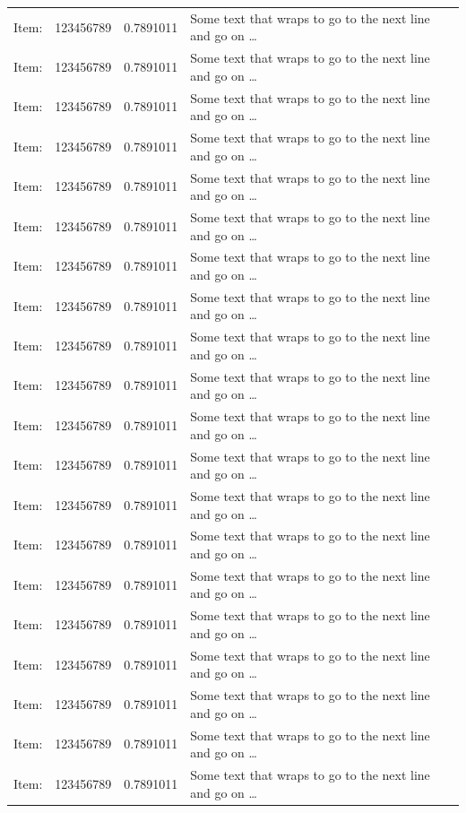 \documentclass[ms-thesis,mathdesign,chpterrefs,showgrid]{ndsu-thesis-tagged}%
\begin{document}
\begin{xltabular}{\textwidth}{ Y ZZ A }
    Item: & 123456789 & 0.7891011 & Some text that wraps to go to the next line and go on \ldots  \\
    Item: & 123456789 & 0.7891011 & Some text that wraps to go to the next line and go on \ldots  \\
    Item: & 123456789 & 0.7891011 & Some text that wraps to go to the next line and go on \ldots  \\
    \cmidrule(lr){2-3}
    Item: & 123456789 & 0.7891011 & Some text that wraps to go to the next line and go on \ldots  \\
    Item: & 123456789 & 0.7891011 & Some text that wraps to go to the next line and go on \ldots  \\
    Item: & 123456789 & 0.7891011 & Some text that wraps to go to the next line and go on \ldots  \\
    \cmidrule(lr){2-4}
    Item: & 123456789 & 0.7891011 & Some text that wraps to go to the next line and go on \ldots  \\
    Item: & 123456789 & 0.7891011 & Some text that wraps to go to the next line and go on \ldots  \\
    \cmidrule(lr){1-3}
    Item: & 123456789 & 0.7891011 & Some text that wraps to go to the next line and go on \ldots  \\
    Item: & 123456789 & 0.7891011 & Some text that wraps to go to the next line and go on \ldots  \\
    Item: & 123456789 & 0.7891011 & Some text that wraps to go to the next line and go on \ldots  \\
\midrule
    Item: & 123456789 & 0.7891011 & Some text that wraps to go to the next line and go on \ldots  \\
    Item: & 123456789 & 0.7891011 & Some text that wraps to go to the next line and go on \ldots  \\
    Item: & 123456789 & 0.7891011 & Some text that wraps to go to the next line and go on \ldots  \\
    Item: & 123456789 & 0.7891011 & Some text that wraps to go to the next line and go on \ldots  \\
    Item: & 123456789 & 0.7891011 & Some text that wraps to go to the next line and go on \ldots  \\
    Item: & 123456789 & 0.7891011 & Some text that wraps to go to the next line and go on \ldots  \\
    Item: & 123456789 & 0.7891011 & Some text that wraps to go to the next line and go on \ldots  \\
    Item: & 123456789 & 0.7891011 & Some text that wraps to go to the next line and go on \ldots  \\
    Item: & 123456789 & 0.7891011 & Some text that wraps to go to the next line and go on \ldots  \\
 \end{xltabular}
\endgroup
\end{document}

